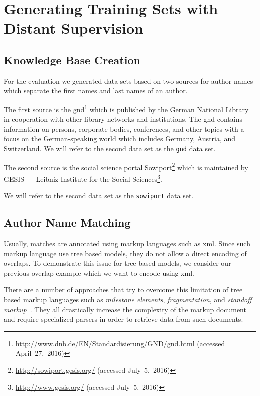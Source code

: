 \section{Generating Training Sets with Distant Supervision}\label{sec:i-distant-supervision}

\subsection{Knowledge Base Creation}\label{sec:i-knowledge-base-creation}


For the evaluation we generated data sets based on two sources for author names which separate the first names and last names of an author.

\bigskip

The first source is the \acrfull{gnd}\footnote{\url{http://www.dnb.de/EN/Standardisierung/GND/gnd.html} (accessed April~27,~2016)} which is published by the German National Library in cooperation with other library networks and institutions.
The \gls{gnd} contains information on persons, corporate bodies, conferences, and other topics with a focus on the German-speaking world which includes Germany, Austria, and Switzerland.
We will refer to the second data set as the \texttt{gnd} data set.

\bigskip

The second source is the social science portal Sowiport\footnote{\url{http://sowiport.gesis.org/} (accessed July~5,~2016)} which is maintained by GESIS --- Leibniz Institute for the Social Sciences\footnote{\url{http://www.gesis.org/} (accessed July~5,~2016)}.


We will refer to the second data set as the \texttt{sowiport} data set.


\subsection{Author Name Matching}\label{subsec:i-author-name-matching}
Usually, matches are annotated using markup languages such as \gls{xml}.
Since such markup language use tree based models, they do not allow a direct encoding of overlaps.
To demonstrate this issue for tree based models, we consider our previous overlap example which we want to encode using \gls{xml}\@{}.

There are a number of approaches that try to overcome this limitation of tree based markup languages such as \textit{milestone elements}, \textit{fragmentation}, and \textit{standoff markup}~\citep{sperberg2000goddag}. They all drastically increase the complexity of the markup document and require specialized parsers in order to retrieve data from such documents.

